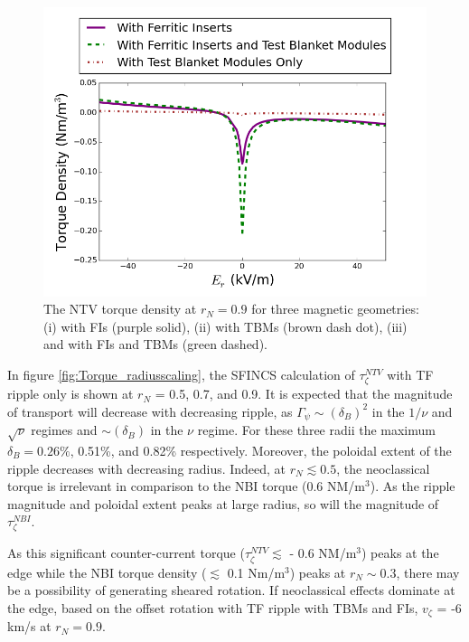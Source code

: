 \documentclass{article}
\begin{document}
\begin{figure}[h!]
\centering
\includegraphics[width=1\textwidth]{Torque_comparingTBMandFI.png}
\caption{\label{fig:Torque_comparingTBMandFI} The NTV torque density at $r_N = 0.9$ for three magnetic geometries: (i) with FIs (purple solid), (ii) with TBMs (brown dash dot), (iii) and with FIs and TBMs (green dashed).}
\end{figure}

In figure \ref{fig:Torque_radiusscaling}, the SFINCS calculation of $\tau_{\zeta}^{NTV}$ with TF ripple only is shown at $r_N$ = 0.5, 0.7, and 0.9. It is expected that the magnitude of transport will decrease with decreasing ripple, as $\Gamma_{\psi} \sim (\delta_B)^2$ in the $1/\nu$ and $\sqrt{\nu}$ regimes and $\sim (\delta_B)$ in the $\nu$ regime. For these three radii the maximum $\delta_B = 0.26\%$, 0.51\%, and 0.82\% respectively. Moreover, the poloidal extent of the ripple decreases with decreasing radius. Indeed, at $r_N \lesssim 0.5$, the neoclassical torque is irrelevant in comparison to the NBI torque (0.6 NM/m$^3$). As the ripple magnitude and poloidal extent peaks at large radius, so will the magnitude of $\tau_{\zeta}^{NBI}$. 

As this significant counter-current torque ($\tau_{\zeta}^{NTV} \lesssim$ - 0.6 NM/m$^3$) peaks at the edge while the NBI torque density ($\lesssim$ 0.1 Nm/m$^3$) peaks at $r_N \sim 0.3$, there may be a possibility of generating sheared rotation. If neoclassical effects dominate at the edge, based on the offset rotation with TF ripple with TBMs and FIs, $v_{\zeta}$ = -6 km/s at $r_N = 0.9$. 
\end{document}
